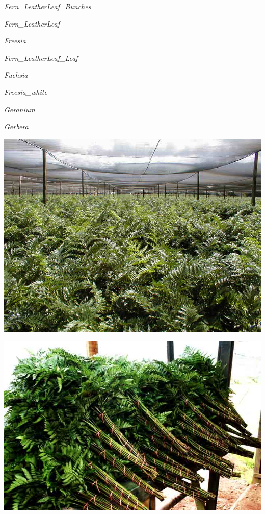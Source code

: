 \documentclass{article}
\begin{document}
\noindent   
\vfill
\centerline{{\Large\emph{Fern_LeatherLeaf_Bunches}}}
\vfill
\newpage

\noindent   
\vfill
\centerline{{\Large\emph{Fern_LeatherLeaf}}}
\vfill
\newpage

\noindent   
\vfill
\centerline{{\Large\emph{Freesia}}}
\vfill
\newpage

\noindent   
\vfill
\centerline{{\Large\emph{Fern_LeatherLeaf_Leaf}}}
\vfill
\newpage

\noindent   
\vfill
\centerline{{\Large\emph{Fuchsia}}}
\vfill
\newpage

\noindent   
\vfill
\centerline{{\Large\emph{Freesia_white}}}
\vfill
\newpage

\noindent   
\vfill
\centerline{{\Large\emph{Geranium}}}
\vfill
\newpage

\noindent   
\vfill
\centerline{{\Large\emph{Gerbera}}}
\vfill
\newpage

\begin{center}
\includegraphics[width=0.9\textheight, angle=90]{../Fern_LeatherLeaf.jpg}
\end{center}
\newpage

\begin{center}
\includegraphics[width=0.9\textheight, angle=90]{../Fern_LeatherLeaf_Bunches.jpg}
\end{center}
\newpage
\end{document}

